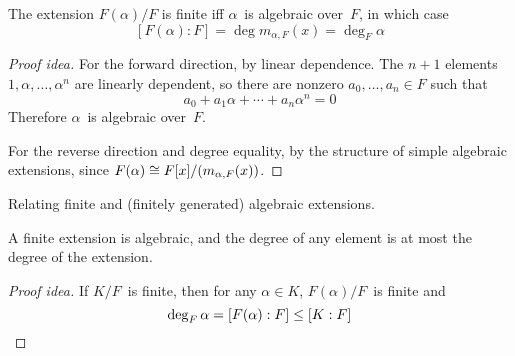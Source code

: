 \begin{thm}
The extension \(F(\alpha)/F\) is finite iff \(\alpha\)~is algebraic over~\(F\), in which case
\[[F(\alpha):F]=\deg m_{\alpha,F}(x)=\deg_F\alpha\]
\end{thm}
\begin{proof}[Proof idea]
For the forward direction, by linear dependence. The \(n+1\) elements \(1,\alpha,\ldots,\alpha^n\)
are linearly dependent, so there are nonzero \(a_0,\ldots,a_n\in F\) such that
\[a_0+a_1\alpha+\cdots+a_n\alpha^n=0\]
Therefore \(\alpha\)~is algebraic over~\(F\).

For the reverse direction and degree equality, by the structure of simple algebraic extensions, since \(F(\alpha)\cong F[x]/(m_{\alpha,F}(x))\).
\end{proof}
\begin{app}
Relating finite and (finitely generated) algebraic extensions.
\end{app}
\begin{cor}
A finite extension is algebraic, and the degree of any element is at most the degree of the extension.
\end{cor}
\begin{proof}[Proof idea]
If \(K/F\)~is finite, then for any \(\alpha\in K\), \(F(\alpha)/F\)~is finite and
\begin{equation*}
\deg_F\alpha=[F(\alpha):F]\le[K:F]\qedhere
\end{equation*}
\end{proof}

